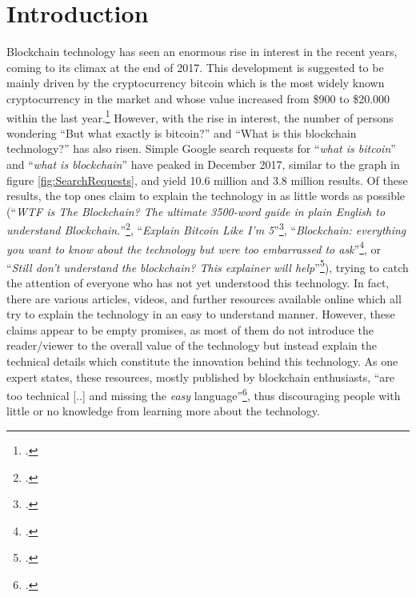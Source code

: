 \chapter{Introduction}
\label{chapter:Intro}

Blockchain technology has seen an enormous rise in interest in the recent years, coming to its climax at the end of 2017. This development is suggested to be mainly driven by the cryptocurrency bitcoin which is the most widely known cryptocurrency in the market and whose value increased from \$900 to \$20.000 within the last year.\footcite[Cf.]{Higgins900200002017}
However, with the rise in interest, the number of persons wondering \enquote{But what exactly is bitcoin?} and \enquote{What is this blockchain technology?} has also risen. Simple Google search requests for \enquote{\textit{what is bitcoin}} and \enquote{\textit{what is blockchain}} have peaked in December 2017, similar to the graph in figure \ref{fig:SearchRequests}, and yield 10.6 million and 3.8 million results. Of these results, the top ones claim to explain the technology in as little words as possible (\enquote{\textit{WTF is The Blockchain?
The ultimate 3500-word guide in plain English to understand Blockchain.}}\footcite{MamoriaWTFBlockchain2017}, \enquote{\textit{Explain Bitcoin Like I'm 5}}\footcite{CustodioExplainBitcoinFive2013}, \enquote{\textit{Blockchain: everything you want to know about the technology but were too embarrassed to ask}}\footcite{HeathmannBlockchaineverythingyou2018}, or \enquote{\textit{Still don't understand the blockchain? This explainer will help}}\footcite{LeighSinodStilldonunderstand2018}), trying to catch the attention of everyone who has not yet understood this technology. In fact, there are various articles, videos, and further resources available online which all try to explain the technology in an easy to understand manner. However, these claims appear to be empty promises, as most of them do not introduce the reader/viewer to the overall value of the technology but instead explain the technical details which constitute the innovation behind this technology. As one expert states, these resources, mostly published by blockchain enthusiasts, \enquote{are too technical [..] and missing the \textit{easy} language}\footcite[Cf.][P19, P20]{DanielKaltenbach_Interview}, thus discouraging people with little or no knowledge from learning more about the technology.

